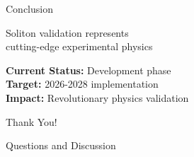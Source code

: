 \begin{frame}{Conclusion}
    \begin{center}
        \Large
        Soliton validation represents\\
        cutting-edge experimental physics
        
        \vspace{1cm}
        \normalsize
        \textbf{Current Status:} Development phase\\
        \textbf{Target:} 2026-2028 implementation\\
        \textbf{Impact:} Revolutionary physics validation
    \end{center}
\end{frame}

\begin{frame}
    \begin{center}
        \Huge Thank You!
        
        \vspace{1cm}
        \Large Questions and Discussion
    \end{center}
\end{frame}

